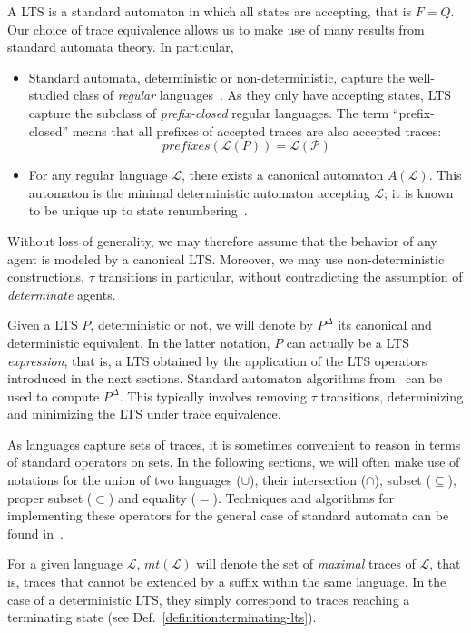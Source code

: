 A LTS is a standard automaton in which all states are accepting, that is $F = Q$. Our choice of trace equivalence allows us to make use of many results from standard automata theory. In particular,
\begin{itemize}
\item Standard automata, deterministic or non-deterministic, capture the well-studied class of \emph{regular} languages~\cite{Hopcroft:1979}. As they only have accepting states, LTS capture the subclass of \emph{prefix-closed} regular languages. The term ``prefix-closed'' means that all prefixes of accepted traces are also accepted traces: 
\begin{equation*}
prefixes(\mathcal{L}(P)) = \mathcal{L(P)}
\end{equation*}
\item For any regular language $\mathcal{L}$, there exists a canonical automaton $A(\mathcal{L})$. This automaton is the minimal deterministic automaton accepting $\mathcal{L}$; it is known to be unique up to state renumbering~\cite{Hopcroft:1979}. 
\end{itemize}

Without loss of generality, we may therefore assume that the behavior of any agent is modeled by a canonical LTS. Moreover, we may use non-deterministic constructions, $\tau$ transitions in particular, without contradicting the assumption of \emph{determinate} agents. 

Given a LTS $P$, deterministic or not, we will denote by $P^{\Delta}$ its canonical and deterministic equivalent. In the latter notation, $P$ can actually be a LTS \emph{expression}, that is, a LTS obtained by the application of the LTS operators introduced in the next sections. Standard automaton algorithms from~\cite{Hopcroft:1979} can be used to compute $P^\Delta$. This typically involves removing $\tau$ transitions, determinizing and minimizing the LTS under trace equivalence.

As languages capture sets of traces, it is sometimes convenient to reason in terms of standard operators on sets. In the following sections, we will often make use of notations for the union of two languages ($\cup$), their intersection ($\cap$), subset ($\subseteq$), proper subset ($\subset$) and equality ($=$). Techniques and algorithms for implementing these operators for the general case of standard automata can be found in~\cite{Hopcroft:1979, Aho:1986}. 

For a given language $\mathcal{L}$, $mt(\mathcal{L})$ will denote the set of \emph{maximal} traces of $\mathcal{L}$, that is, traces that cannot be extended by a suffix within the same language. In the case of a deterministic LTS, they simply correspond to traces reaching a terminating state (see Def.~\ref{definition:terminating-lts}).

